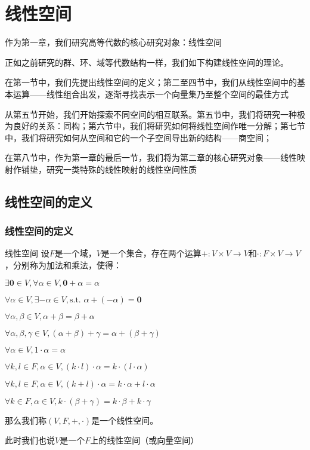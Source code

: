 \documentclass[12pt, a4paper, oneside, UTF8]{ctexbook}
\begin{document}
% 
\else
\fi
\chapter{线性空间}
	作为第一章，我们研究高等代数的核心研究对象：线性空间

	正如之前研究的群、环、域等代数结构一样，我们如下构建线性空间的理论。
	
	在第一节中，我们先提出线性空间的定义；第二至四节中，我们从线性空间中的基本运算——线性组合出发，逐渐寻找表示一个向量集乃至整个空间的最佳方式

	从第五节开始，我们开始探索不同空间的相互联系。第五节中，我们将研究一种极为良好的关系：同构；第六节中，我们将研究如何将线性空间作唯一分解；第七节中，我们将研究如何从空间和它的一个子空间导出新的结构——商空间；

	在第八节中，作为第一章的最后一节，我们将为第二章的核心研究对象——线性映射作铺垫，研究一类特殊的线性映射的线性空间性质
	\section{线性空间的定义}
		\subsection{线性空间的定义}
			\begin{defn}{线性空间}{}
				设$F$是一个域，$V$是一个集合，存在两个运算$+:V\times V \rightarrow V$和$\cdot : F \times V \rightarrow V$，分别称为加法和乘法，使得：

				 $\exists \mathbf{0} \in V,\forall \alpha \in V,\mathbf{0}+\alpha=\alpha $

				 $\forall \alpha \in V,\exists -\alpha \in V,\text{s.t. } \alpha + (-\alpha )=\mathbf{0}$

				 $\forall \alpha, \beta \in V,\alpha + \beta = \beta + \alpha$

				 $\forall \alpha, \beta, \gamma \in V,(\alpha+\beta)+\gamma=\alpha+(\beta+\gamma)$

				 $\forall \alpha \in V,1 \cdot \alpha =\alpha $

				 $\forall k,l \in F,\alpha \in V,(k\cdot l)\cdot \alpha =k\cdot (l\cdot \alpha )$

				 $\forall k,l \in F,\alpha \in V,(k+l)\cdot \alpha=k\cdot \alpha + l\cdot \alpha  $

				 $\forall k \in F,\alpha \in V,k\cdot (\beta + \gamma )=k\cdot \beta + k\cdot \gamma $

				那么我们称$(V,F,+,\cdot)$是一个线性空间。
				
				此时我们也说$V$是一个$F$上的线性空间（或向量空间）
			\end{defn}
\end{document}
